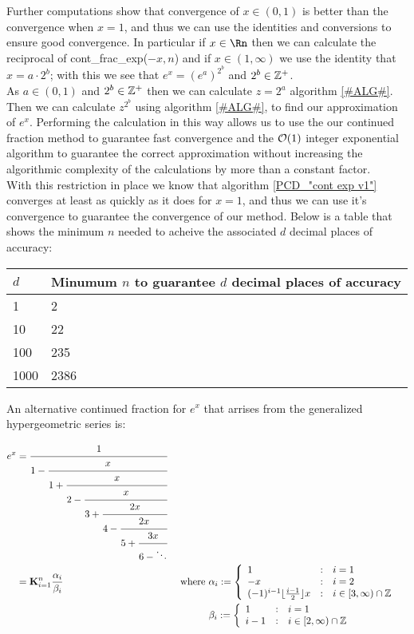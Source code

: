 Further computations show that convergence of \(x \in (0, 1)\) is better than the convergence when \(x=1\), and thus we can use the identities and conversions to ensure good convergence. In particular if \(x \in \Rn\) then we can calculate the reciprocal of \textrm{cont\_frac\_exp(\(-x, n\))} and if \(x \in (1,\infty)\) we use the identity that \(x = a\cdot2^b\); with this we see that \(e^x = (e^a)^{2^b}\) and \(2^b \in \mathbb{Z}^+\).\\

As \(a \in (0,1)\) and \(2^b \in \mathbb{Z}^+\) then we can calculate \(z = 2^a\) algorithm \ref{#ALG#}. Then we can calculate \(z^{2^b}\) using algorithm \ref{#ALG#}, to find our approximation of \(e^x\). Performing the calculation in this way allows us to use the our continued fraction method to guarantee fast convergence and the \(\mathcal{O}(1)\) integer exponential algorithm to guarantee the correct approximation without increasing the algorithmic complexity of the calculations by more than a constant factor.\\

With this restriction in place we know that algorithm \ref{PCD_"cont exp v1"} converges at least as quickly as it does for \(x = 1\), and thus we can use it's convergence to guarantee the convergence of our method. Below is a table that shows the minimum \(n\) needed to acheive the associated \(d\) decimal places of accuracy:

\begin{center}
\begin{tabular}{|l|l|}
\hline
\(d\) & Minumum \(n\) to guarantee \(d\) decimal places of accuracy\\\hline
1 & 2 \\\hline
10 & 22 \\\hline
100 & 235 \\\hline
1000 & 2386 \\\hline
\end{tabular}
\end{center}

An alternative continued fraction for \(e^x\) that arrises from the generalized hypergeometric series is:

\begin{align}
e^x &= \cfrac{1}{1 -
	   \cfrac{x}{1 +
	   \cfrac{x}{2 -
	   \cfrac{x}{3 +
	   \cfrac{2x}{4 -
	   \cfrac{2x}{5 +
	   \cfrac{3x}{6 - \ddots} } } } } } } \label{EQN_"exp cont frac 2"}\\
	&= \mathbf{K}_{i=1}^n\frac{\alpha_i}{\beta_i} &\textrm{ where } 
		&\alpha_i := \left\{\begin{array}{lcl}
			1 &:& i = 1\\
			-x &:& i = 2\\
			(-1)^{i-1}\lfloor\frac{i-1}{2}\rfloor x&:&i\in[3,\infty)\cap\mathbb{Z}
			\end{array}\right.\nonumber\\
	&  &&\beta_i := \left\{\begin{array}{lcl}
			1 &:& i=1\\
			i-1 &:& i \in [2, \infty) \cap\mathbb{Z}
			\end{array}\right.\nonumber
\end{align}

